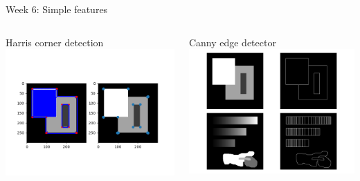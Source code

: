 \documentclass[aspectratio=169,hyperref={pdfpagelabels=false}]{beamer}
\begin{document}
\begin{frame}{ Week 6: Simple features }
	\begin{columns}
		\begin{column}{.45\textwidth}
			\begin{block}{Harris corner detection}
			\includegraphics[width=\textwidth]{exercise_imgs/ex6-5.png}
			\end{block}
		\end{column}
		\begin{column}{.45\textwidth}
			\begin{block}{Canny edge detector}
			\includegraphics[width=\textwidth]{exercise_imgs/ex6-6.png}
			\end{block}
		\end{column}
	\end{columns}
\end{frame}
\end{document}

